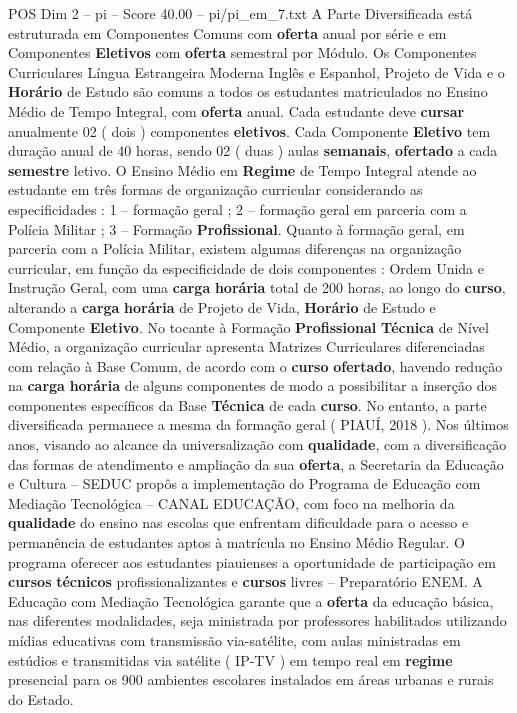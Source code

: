 \begin{textsample}{POS Dim 2 – pi – Score 40.00 – pi/pi\_em\_7.txt}
A Parte Diversificada está estruturada em Componentes Comuns com \textbf{oferta} anual por série e em Componentes \textbf{Eletivos} com \textbf{oferta} semestral por Módulo.
Os Componentes Curriculares Língua Estrangeira Moderna Inglês e Espanhol, Projeto de Vida e o \textbf{Horário} de Estudo são comuns a todos os estudantes matriculados no Ensino Médio de Tempo Integral, com \textbf{oferta} anual.
Cada estudante deve \textbf{cursar} anualmente 02 ( dois ) componentes \textbf{eletivos}.
Cada Componente \textbf{Eletivo} tem duração anual de 40 horas, sendo 02 ( duas ) aulas \textbf{semanais}, \textbf{ofertado} a cada \textbf{semestre} letivo.
O Ensino Médio em \textbf{Regime} de Tempo Integral atende ao estudante em três formas de organização curricular considerando as especificidades : 1 – formação geral ; 2 – formação geral em parceria com a Polícia Militar ; 3 – Formação \textbf{Profissional}.
Quanto à formação geral, em parceria com a Polícia Militar, existem algumas diferenças na organização curricular, em função da especificidade de dois componentes : Ordem Unida e Instrução Geral, com uma \textbf{carga} \textbf{horária} total de 200 horas, ao longo do \textbf{curso}, alterando a \textbf{carga} \textbf{horária} de Projeto de Vida, \textbf{Horário} de Estudo e Componente \textbf{Eletivo}.
No tocante à Formação \textbf{Profissional} \textbf{Técnica} de Nível Médio, a organização curricular apresenta Matrizes Curriculares diferenciadas com relação à Base Comum, de acordo com o \textbf{curso} \textbf{ofertado}, havendo redução na \textbf{carga} \textbf{horária} de alguns componentes de modo a possibilitar a inserção dos componentes específicos da Base \textbf{Técnica} de cada \textbf{curso}.
No entanto, a parte diversificada permanece a mesma da formação geral ( PIAUÍ, 2018 ).
Nos últimos anos, visando ao alcance da universalização com \textbf{qualidade}, com a diversificação das formas de atendimento e ampliação da sua \textbf{oferta}, a Secretaria da Educação e Cultura – SEDUC propôs a implementação do Programa de Educação com Mediação Tecnológica – CANAL EDUCAÇÃO, com foco na melhoria da \textbf{qualidade} do ensino nas escolas que enfrentam dificuldade para o acesso e permanência de estudantes aptos à matrícula no Ensino Médio Regular.
O programa oferecer aos estudantes piauienses a oportunidade de participação em \textbf{cursos} \textbf{técnicos} profissionalizantes e \textbf{cursos} livres – Preparatório ENEM.
A Educação com Mediação Tecnológica garante que a \textbf{oferta} da educação básica, nas diferentes modalidades, seja ministrada por professores habilitados utilizando mídias educativas com transmissão via-satélite, com aulas ministradas em estúdios e transmitidas via satélite ( IP-TV ) em tempo real em \textbf{regime} presencial para os 900 ambientes escolares instalados em áreas urbanas e rurais do Estado.

\end{textsample}
